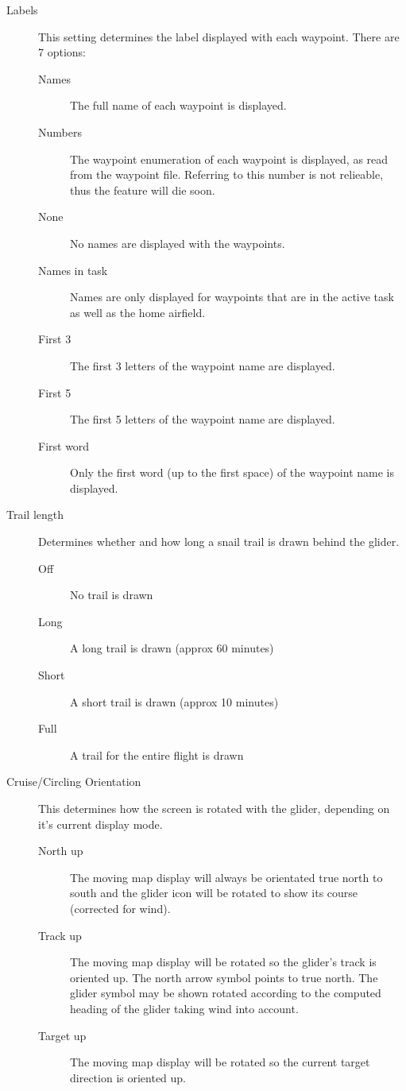 \documentclass[a4paper,12pt]{refrep}
\begin{document}
\begin{description}
\item[Labels] This setting \label{conf:labels} determines the label
displayed with each waypoint. There are 7 options:

\begin{description}
\item[Names] The full name of each waypoint is displayed.
\item[Numbers] The waypoint enumeration of each waypoint is displayed, as read
from the waypoint file. Referring to this number is not relieable, thus the
feature will die soon.
\item[None] No names are displayed with the waypoints.
\item[Names in task] Names are only displayed for waypoints that are in the active task as well as the home airfield.
\item[First 3] The first 3 letters of the waypoint name are displayed.
\item[First 5] The first 5 letters of the waypoint name are displayed.
\item[First word] Only the first word (up to the first space) of the waypoint name is displayed.
\end{description}

\item[Trail length] \label{conf:snailtrail} Determines whether and how long a
snail trail is drawn behind the glider.
\begin{description}
\item[Off] No trail is drawn
\item[Long] A long trail is drawn (approx 60 minutes)
\item[Short] A short trail is drawn (approx 10 minutes) 
\item[Full] A trail for the entire flight is drawn
\end{description}

\item[Cruise/Circling Orientation] \label{conf:orientation} This determines how
the screen is rotated with the glider, depending on it's current display mode.
\begin{description}
\item[North up] The moving map display will always be orientated true north to
south and the glider icon will be rotated to show its course (corrected for
wind).
\item[Track up] The moving map display will be rotated so the glider's track
 is oriented up. The north arrow symbol points to true north. The glider symbol 
 may be shown rotated according to the computed heading of the glider taking wind into account.
\item[Target up] The moving map display will be rotated so the current target
direction is oriented up.
\end{description}


\end{description}
\end{document}
